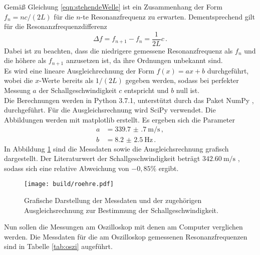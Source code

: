 Gemäß Gleichung \eqref{eqn:stehendeWelle} ist ein Zusammenhang der Form $f_n = nc/(2 L)$
für die $n$-te Resonanzfrequenz zu erwarten. Dementsprechend gilt für die Resonanzfrequenzdifferenz
\begin{equation}
	\Delta f = f_{n+1} - f_n = \frac{1}{2L} c\,.
	\label{eqn:deltaf}
\end{equation}
Dabei ist zu beachten, dass die niedrigere gemessene Resonanzfrequenz als $f_n$ und die höhere als $f_{n+1}$ anzusetzen ist, da ihre Ordnungen unbekannt sind.\\
Es wird eine lineare Ausgleichrechnung der Form $f(x)=ax+b$ durchgeführt, wobei die $x$-Werte bereits als $1/(2L)$ gegeben werden, sodass bei perfekter Messung $a$ der Schallgeschwindigkeit $c$ entspricht und $b$ null ist.\\
Die Berechnungen werden in Python 3.7.1, unterstützt durch das Paket NumPy \cite{numpy}, durchgeführt.
Für die Ausgleichsrechnung wird SciPy \cite{scipy} verwendet. Die Abbildungen werden mit matplotlib \cite{matplotlib} erstellt. Es ergeben sich die Parameter
\begin{align*}
  a&=\SI{339.7(7)}{\meter\per\second}\,, \\
  b&=\SI{8.2(25)}{\Hz}\,.
\end{align*}
In Abbildung \ref{fig:roehre} sind die Messdaten sowie die Ausgleichsrechnung grafisch
dargestellt.
Der Literaturwert der Schallgeschwindigkeit beträgt $\SI{342.60}{\meter\per\second}$ \cite{Schallgeschwindigkeit}, sodass sich eine relative Abweichung von $-0{,}85\%$ ergibt.

\begin{figure}
  \centering
  \texttt{[image: build/roehre.pdf]}
  \caption{Grafische Darstellung der Messdaten und der zugehörigen Ausgleichsrechnung
  zur Bestimmung der Schallgeschwindigkeit.}
  \label{fig:roehre}
\end{figure}

Nun sollen die Messungen am Oszilloskop mit denen am Computer verglichen werden.
Die Messdaten für die am Oszilloskop gemessenen Resonanzfrequenzen sind in Tabelle
\ref{tab:oszi} augeführt.

